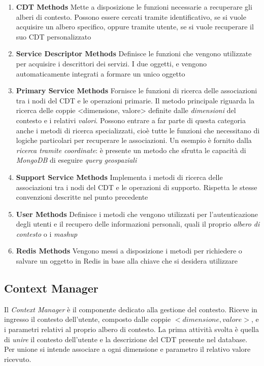 \begin{enumerate}
	\item \textbf{CDT Methods}
	Mette a disposizione le funzioni necessarie a recuperare gli alberi di contesto. Possono essere cercati tramite identificativo, se si vuole acquisire un albero specifico, oppure tramite utente, se si vuole recuperare il suo CDT personalizzato
	\item \textbf{Service Descriptor Methods}
	Definisce le funzioni che vengono utilizzate per acquisire i descrittori dei servizi. I due oggetti,  e  vengono automaticamente integrati a formare un unico oggetto
	\item \textbf{Primary Service Methods}
	Fornisce le funzioni di ricerca delle associazioni tra i nodi del CDT e le operazioni primarie. Il metodo principale riguarda la ricerca delle coppie {<}dimensione, valore{>} definite dalle \emph{dimensioni} del contesto e i relativi \emph{valori}. Possono entrare a far parte di questa categoria anche i metodi di ricerca specializzati, cioè tutte le funzioni che necessitano di logiche particolari per recuperare le associazioni. Un esempio è fornito dalla \emph{ricerca tramite coordinate}: è presente un metodo che sfrutta le capacità di \emph{MongoDB} di eseguire \emph{query geospaziali}
	\item \textbf{Support Service Methods}
	Implementa i metodi di ricerca delle associazioni tra i nodi del CDT e le operazioni di supporto. Rispetta le stesse convenzioni descritte nel punto precedente
	\item \textbf{User Methods}
	Definisce i metodi che vengono utilizzati per l'autenticazione degli utenti e il recupero delle informazioni personali, quali il proprio \emph{albero di contesto} o i \emph{mashup}
	\item \textbf{Redis Methods}
	Vengono messi a disposizione i metodi per richiedere o salvare un oggetto in Redis in base alla chiave che si desidera utilizzare
\end{enumerate}

\subsection{Context Manager\label{sec:context-manager}}

Il \emph{Context Manager} è il componente dedicato alla gestione del contesto. Riceve in ingresso il contesto dell'utente, composto dalle coppie $ {<}dimensione, valore{>} $, e i parametri relativi al proprio albero di contesto. La prima attività svolta è quella di \emph{unire} il contesto dell'utente e la descrizione del CDT presente nel database. Per unione si intende associare a ogni dimensione e parametro il relativo valore ricevuto.

